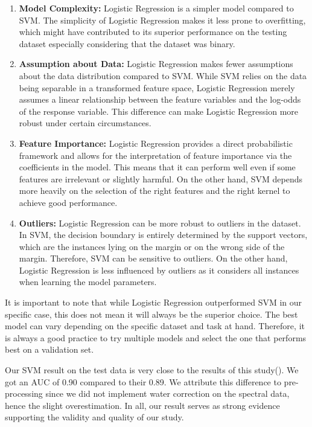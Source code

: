 \documentclass{cernatsnote}
\begin{document}
\begin{enumerate}
\item \textbf{Model Complexity:} Logistic Regression is a simpler model compared to SVM. The simplicity of Logistic Regression makes it less prone to overfitting, which might have contributed to its superior performance on the testing dataset especially considering that the dataset was binary.

\item \textbf{Assumption about Data:} Logistic Regression makes fewer assumptions about the data distribution compared to SVM. While SVM relies on the data being separable in a transformed feature space, Logistic Regression merely assumes a linear relationship between the feature variables and the log-odds of the response variable. This difference can make Logistic Regression more robust under certain circumstances.

\item \textbf{Feature Importance:} Logistic Regression provides a direct probabilistic framework and allows for the interpretation of feature importance via the coefficients in the model. This means that it can perform well even if some features are irrelevant or slightly harmful. On the other hand, SVM depends more heavily on the selection of the right features and the right kernel to achieve good performance.

\item \textbf{Outliers:} Logistic Regression can be more robust to outliers in the dataset. In SVM, the decision boundary is entirely determined by the support vectors, which are the instances lying on the margin or on the wrong side of the margin. Therefore, SVM can be sensitive to outliers. On the other hand, Logistic Regression is less influenced by outliers as it considers all instances when learning the model parameters.
\end{enumerate}

It is important to note that while Logistic Regression outperformed SVM in our specific case, this does not mean it will always be the superior choice. The best model can vary depending on the specific dataset and task at hand. Therefore, it is always a good practice to try multiple models and select the one that performs best on a validation set. 

Our SVM result on the test data is very close to the results of this study(\cite{huber2021infrared}). We got an AUC of 0.90 compared to their 0.89. We attribute this difference to pre-processing since we did not implement water correction on the spectral data, hence the slight overestimation. In all, our result serves as strong evidence supporting the validity and quality of our study. 
\end{document}
